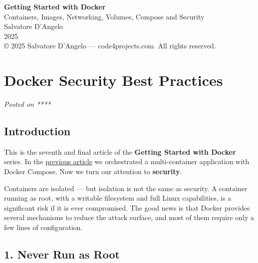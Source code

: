 \documentclass[11pt,american,a4paper,]{book}
\begin{document}
\frontmatter
\thispagestyle{empty}
\vspace*{2cm}
\begin{center}
  {\fontsize{36}{44}\selectfont\bfseries\sffamily Getting Started with
Docker}\\[0.8em]
  {\Large\sffamily\color{gray} Containers, Images, Networking, Volumes,
Compose and Security}\\[3em]
  {\large Salvatore D'Angelo}\\[0.5em]
  {\normalsize\color{gray} 2025}\\[4em]
  {\small\color{gray} © 2025 Salvatore D'Angelo --- code4projects.com.
All rights reserved.}
\end{center}
\newpage

{
\hypersetup{linkcolor=NavyBlue}
\setcounter{tocdepth}{2}
\tableofcontents
}
\newpage

\mainmatter
\section{Docker Security Best
Practices}\label{docker-security-best-practices}

\emph{Posted on ****}

\subsection{Introduction}\label{introduction}

This is the seventh and final article of the \textbf{Getting Started
with Docker} series. In the
\href{/Users/sasadangelo/github.com/sasadangelo/code4projects/how-docker-compose-works-2025/}{previous
article} we orchestrated a multi-container application with Docker
Compose. Now we turn our attention to \textbf{security}.

Containers are isolated --- but isolation is not the same as security. A
container running as root, with a writable filesystem and full Linux
capabilities, is a significant risk if it is ever compromised. The good
news is that Docker provides several mechanisms to reduce the attack
surface, and most of them require only a few lines of configuration.

\subsection{1. Never Run as Root}\label{never-run-as-root}
\end{document}
